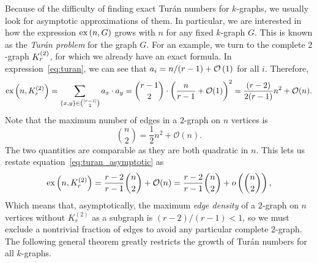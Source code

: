 Because of the difficulty of finding exact Turán numbers for $k$-graphs,
we usually look for asymptotic approximations of them.
In particular, we are interested in how the expression
$\text{ex} \left( n, G \right)$ grows with $n$ for any fixed $k$-graph $G$.
This is known as the \emph{Turán problem} for the graph $G$.
For an example, we turn to the complete $2$-graph $K^{(2)}_{r}$,
for which we already have an exact formula.
In expression~\eqref{eq:turan}, we can see that
$a_i = n/(r-1) + \mathcal{O}\left(1\right)$ for all $i$.
Therefore,
\begin{equation} \label{eq:turan_asymptotic}
    \text{ex} \left( n, K^{(2)}_{r} \right) = \sum_{\{x, y\} \in \binom{[r-1]}{2}} a_x \cdot a_y
    = \binom{r-1}{2} \cdot \left( \frac{n}{r-1} + \mathcal{O}(1) \right)^2
    = \frac{(r-2)}{2(r-1)} n^2 + \mathcal{O}(n).
\end{equation}
Note that the maximum number of edges in a $2$-graph on $n$ vertices is
\[
    \binom{n}{2} = \frac{1}{2} n^2 + \mathcal{O}(n).
\]
The two quantities are comparable as they are both quadratic in $n$.
This lets us restate equation~\eqref{eq:turan_asymptotic} as
\begin{equation} \label{eq:turan_asymptotic_density}
    \text{ex} \left( n, K^{(2)}_{r} \right) =
    \frac{r-2}{r-1} \binom{n}{2} + \mathcal{O}(n) =
    \frac{r-2}{r-1} \binom{n}{2} + o\left(\binom{n}{2}\right),
\end{equation}
Which means that, asymptotically, the maximum \emph{edge density} of a $2$-graph on $n$ vertices
without $K_r^{(2)}$ as a subgraph is $(r-2)/(r-1) < 1$, so we must exclude a nontrivial fraction of edges
to avoid any particular complete $2$-graph.
The following general theorem greatly restricts the growth of Turán numbers
for all $k$-graphs.

